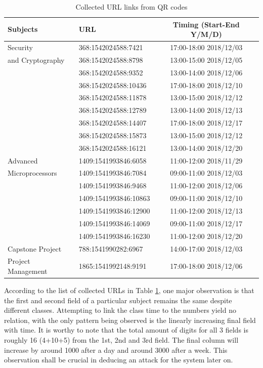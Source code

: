 \documentclass[runningheads]{llncs}
\begin{document}
\begin{table}
    \caption{Collected URL links from QR codes}
    \centering
    \begin{tabular}{|l|l|c|}
    \hline
    Subjects & URL & Timing (Start-End Y/M/D)\\
    \hline
    Security            & 368:1542024588:7421   & 17:00-18:00 2018/12/03\\
    and Cryptography    & 368:1542024588:8798   & 13:00-15:00 2018/12/05\\
                        & 368:1542024588:9352   & 13:00-14:00 2018/12/06\\
                        & 368:1542024588:10436  & 17:00-18:00 2018/12/10\\
                        & 368:1542024588:11878  & 13:00-15:00 2018/12/12\\
                        & 368:1542024588:12789  & 13:00-14:00 2018/12/13\\
                        & 368:1542024588:14407  & 17:00-18:00 2018/12/17\\
                        & 368:1542024588:15873  & 13:00-15:00 2018/12/12\\
                        & 368:1542024588:16121  & 13:00-14:00 2018/12/20\\
    \hline
    Advanced            & 1409:1541993846:6058  & 11:00-12:00 2018/11/29\\
    Microprocessors     & 1409:1541993846:7084  & 09:00-11:00 2018/12/03\\
                        & 1409:1541993846:9468   & 11:00-12:00 2018/12/06\\
                        & 1409:1541993846:10863  & 09:00-11:00 2018/12/10\\
                        & 1409:1541993846:12900  & 11:00-12:00 2018/12/13\\
                        & 1409:1541993846:14069  & 09:00-11:00 2018/12/17\\
                        & 1409:1541993846:16230  & 11:00-12:00 2018/12/20\\
    \hline
    Capstone Project    & 788:1541990282:6967   & 14:00-17:00 2018/12/03\\
    \hline
    Project Management  & 1865:1541992148:9191  & 17:00-18:00 2018/12/06\\
    \hline
    \end{tabular}
    \label{tab:collectedurl}
\end{table}

According to the list of collected URLs in Table \ref{tab:collectedurl}, one major observation is that the first and second field of a particular subject remains the same despite different classes. Attempting to link the class time to the numbers yield no relation, with the only pattern being observed is the linearly increasing final field with time. It is worthy to note that the total amount of digits for all 3 fields is roughly 16 (4+10+5) from the 1st, 2nd and 3rd field. The final column will increase by around 1000 after a day and around 3000 after a week. This observation shall be crucial in deducing an attack for the system later on. 
\end{document}
